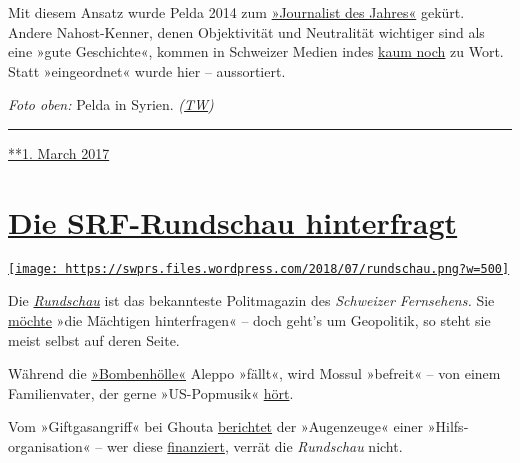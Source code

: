 Mit diesem Ansatz wurde Pelda 2014 zum
\href{http://www.srf.ch/news/panorama/kurt-pelda-ist-journalist-des-jahres}{»Jour­na­list
des Jahres«} gekürt. Andere Nahost-Ken­ner, denen Objek­ti­vi­tät und
Neutra­lität wich­ti­ger sind als eine »gute Ge­schichte«, kommen in
Schwei­zer Medien indes
\href{https://swprs.org/das-gewuenschte-narrativ-ii/}{kaum noch} zu
Wort. Statt »ein­ge­ordnet« wurde hier -- aus­sor­tiert.

\emph{Foto oben:} Pelda in Syrien.
\emph{(\href{https://tageswoche.ch/politik/ein-basler-im-syrischen-kampfgebiet/}{TW})}

\begin{center}\rule{0.5\linewidth}{\linethickness}\end{center}

\href{https://swprs.org/2017/03/01/der-kriegsreporter/}{**1. March 2017}

\hypertarget{die-srf-rundschau-hinterfragt}{%
\section{\texorpdfstring{\href{https://swprs.org/2017/03/01/srf-rundschau/}{Die
SRF-Rundschau
hinterfragt}}{Die SRF-Rundschau hinterfragt}}\label{die-srf-rundschau-hinterfragt}}

\href{https://swprs.org/2017/03/01/srf-rundschau/}{\texttt{[image: https://swprs.files.wordpress.com/2018/07/rundschau.png?w=500]}}

Die
\emph{\href{https://de.wikipedia.org/wiki/Rundschau_(SRF)}{Rundschau}}
ist das bekannteste Polit­ma­ga­zin des \emph{Schweizer Fernsehens.} Sie
\href{https://www.srf.ch/sendungen/rundschau/50-jahre-rundschau-die-jubilaeumssendung}{möchte}
»die Mächtigen hinterfragen« -- doch geht's um Geo­po­litik, so steht
sie meist selbst auf deren Seite.

Während die
\href{https://www.srf.ch/sendungen/rundschau/subventionierte-piloten-vaeter-am-limit-bombenhoelle-aleppo}{»Bombenhölle«}
Aleppo »fällt«, wird Mossul »befreit« -- von einem Familien­vater, der
gerne »US-Popmusik«
\href{https://www.srf.ch/sendungen/rundschau/buben-beschneidung-michel-bollag-pkb-west-mossul}{hört}.

Vom »Giftgasangriff« bei Ghouta
\href{https://www.srf.ch/sendungen/rundschau/kriminaltouristen-verhuetungsmittel-j-bitzer-giftgaseinsatz}{berichtet}
der »Augen­zeuge« einer »Hilfs­organisation« -- wer diese
\href{http://www.uossm.org/who_we_are}{finanziert}, verrät die
\emph{Rundschau} nicht.

